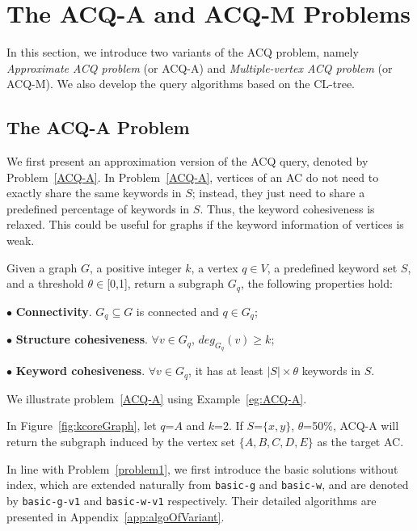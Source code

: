 {\color{blue}
\section{The ACQ-A and ACQ-M Problems}
\label{variant}

In this section, we introduce two variants of the ACQ problem, namely
{\it Approximate ACQ problem} (or ACQ-A) and {\it Multiple-vertex ACQ problem} (or ACQ-M).
We also develop the query algorithms based on the CL-tree.


\subsection{The ACQ-A Problem}

We first present an approximation version of the ACQ query, denoted by Problem~\ref{ACQ-A}.
In Problem~\ref{ACQ-A}, vertices of an AC do not need to exactly share the same keywords in $S$;
instead, they just need to share a predefined percentage of keywords in $S$.
Thus, the keyword cohesiveness is relaxed.
This could be useful for graphs if the keyword information of vertices is weak.

\begin{problem}[ACQ-A]
\label{ACQ-A}
Given a graph $G$, a positive integer $k$, a vertex $q \in V$, a predefined keyword set $S$,
and a threshold $\theta\in$[0,1], return a subgraph $G_q$, the following properties hold:

$\bullet$ \textbf{Connectivity}. $G_q \subseteq G$ is connected and $q\in G_q$;

$\bullet$ \textbf{Structure cohesiveness}. $\forall$$v\in G_q$, $deg_{G_q}(v)\geq$$k$;

$\bullet$ \textbf{Keyword cohesiveness}. $\forall v\in G_q$, it has at least $|S|\times \theta$ keywords in $S$.
\end{problem}

We illustrate problem~\ref{ACQ-A} using Example~\ref{eg:ACQ-A}.
\begin{example}
\label{eg:ACQ-A}
In Figure~\ref{fig:kcoreGraph}, let $q$=$A$ and $k$=2.
If $S$=$\{x,y\}$, $\theta$=50\%, ACQ-A will return the subgraph induced by the vertex set $\{A,B,C,D,E\}$ as the target AC.
\end{example}

In line with Problem~\ref{problem1}, we first introduce the basic solutions without index,
which are extended naturally from {\tt basic-g} and {\tt basic-w},
and are denoted by {\tt basic-g-v1} and {\tt basic-w-v1} respectively.
Their detailed algorithms are presented in Appendix~\ref{app:algoOfVariant}.

}
